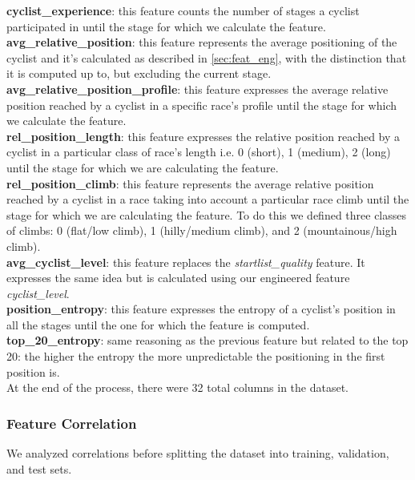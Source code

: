 \noindent
\textbf{cyclist\_experience}: this feature counts the number of stages a cyclist participated in until the stage for which we calculate the feature. \\

\noindent
\textbf{avg\_relative\_position}: this feature represents the average positioning of the cyclist and it's calculated as described in \autoref{sec:feat_eng}, with the distinction that it is computed up to, but excluding the current stage. \\

\noindent
\textbf{avg\_relative\_position\_profile}: this feature expresses the average relative position reached by a cyclist in a specific race's profile until the stage for which we calculate the feature. \\

\noindent
\textbf{rel\_position\_length}: this feature expresses the relative position reached by a cyclist in a particular class of race's length i.e. 0 (short), 1 (medium), 2 (long) until the stage for which we are calculating the feature. \\

\noindent
\textbf{rel\_position\_climb}: this feature represents the average relative position reached by a cyclist in a race taking into account a particular race climb until the stage for which we are calculating the feature. To do this we defined three classes of climbs: 0 (flat/low climb), 1 (hilly/medium climb), and 2 (mountainous/high climb). \\

\noindent
\textbf{avg\_cyclist\_level}: this feature replaces the \textit{startlist\_quality} feature. It expresses the same idea but is calculated using our engineered feature \textit{cyclist\_level}.\\

\noindent
\textbf{position\_entropy}: this feature expresses the entropy of a cyclist's position in all the stages until the one for which the feature is computed.\\

\noindent
\textbf{top\_20\_entropy}: same reasoning as the previous feature but related to the top 20: the higher the entropy the more unpredictable the positioning in the first position is. \\

\noindent At the end of the process, there were 32 total columns in the dataset.

\subsubsection{Feature Correlation}
We analyzed correlations before splitting the dataset into training, validation, and test sets.

